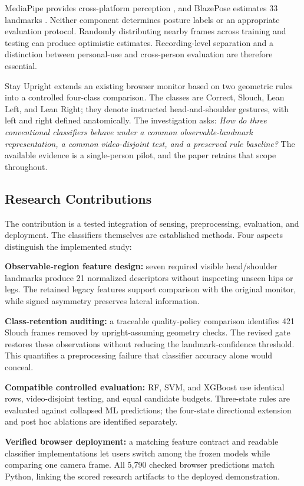 \documentclass[conference]{IEEEtran}
\begin{document}
MediaPipe provides cross-platform perception \cite{mediapipe}, and BlazePose estimates 33 landmarks \cite{blazepose}. Neither component determines posture labels or an appropriate evaluation protocol. Randomly distributing nearby frames across training and testing can produce optimistic estimates. Recording-level separation and a distinction between personal-use and cross-person evaluation are therefore essential.

Stay Upright extends an existing browser monitor based on two geometric rules into a controlled four-class comparison. The classes are Correct, Slouch, Lean Left, and Lean Right; they denote instructed head-and-shoulder gestures, with left and right defined anatomically. The investigation asks: \emph{How do three conventional classifiers behave under a common observable-landmark representation, a common video-disjoint test, and a preserved rule baseline?} The available evidence is a single-person pilot, and the paper retains that scope throughout.

\subsection{Research Contributions}
The contribution is a tested integration of sensing, preprocessing, evaluation, and deployment. The classifiers themselves are established methods. Four aspects distinguish the implemented study:

\textbf{Observable-region feature design:} seven required visible head/shoulder landmarks produce 21 normalized descriptors without inspecting unseen hips or legs. The retained legacy features support comparison with the original monitor, while signed asymmetry preserves lateral information.

\textbf{Class-retention auditing:} a traceable quality-policy comparison identifies 421 Slouch frames removed by upright-assuming geometry checks. The revised gate restores these observations without reducing the landmark-confidence threshold. This quantifies a preprocessing failure that classifier accuracy alone would conceal.

\textbf{Compatible controlled evaluation:} RF, SVM, and XGBoost use identical rows, video-disjoint testing, and equal candidate budgets. Three-state rules are evaluated against collapsed ML predictions; the four-state directional extension and post hoc ablations are identified separately.

\textbf{Verified browser deployment:} a matching feature contract and readable classifier implementations let users switch among the frozen models while comparing one camera frame. All 5,790 checked browser predictions match Python, linking the scored research artifacts to the deployed demonstration.
\end{document}
